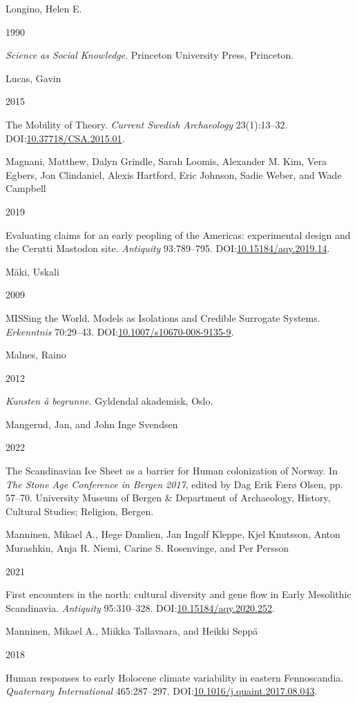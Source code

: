 \documentclass[
  a4paper,
  oneside]{uiophdthesis}
\newlength{\cslhangindent}
\newlength{\csllabelwidth}
\newlength{\cslentryspacingunit} %
\newenvironment{CSLReferences}[2] %
 {%
  \setlength{\parindent}{0pt}
  \ifodd #1
  \let\oldpar\par
  \def\par{\hangindent=\cslhangindent\oldpar}
  \fi
  \setlength{\parskip}{#2\cslentryspacingunit}
 }%
 {}
\newcommand{\CSLBlock}[1]{#1\hfill\break}
\newcommand{\CSLLeftMargin}[1]{\parbox[t]{\csllabelwidth}{#1}}
\newcommand{\CSLRightInline}[1]{\parbox[t]{\linewidth - \csllabelwidth}{#1}\break}
\begin{document}
\begin{CSLReferences}{0}{0}
\leavevmode{}%
\CSLBlock{Longino, Helen E.}
\CSLLeftMargin{ 1990}
\CSLRightInline{\emph{{Science as Social Knowledge}}. Princeton University Press, Princeton.}

\leavevmode{}%
\CSLBlock{Lucas, Gavin}
\CSLLeftMargin{ 2015}
\CSLRightInline{{The Mobility of Theory}. \emph{Current Swedish Archaeology} 23(1):13--32. DOI:\href{https://doi.org/10.37718/CSA.2015.01}{10.37718/CSA.2015.01}.}

\leavevmode{}%
\CSLBlock{Magnani, Matthew, Dalyn Grindle, Sarah Loomis, Alexander M. Kim, Vera Egbers, Jon Clindaniel, Alexis Hartford, Eric Johnson, Sadie Weber, and Wade Campbell}
\CSLLeftMargin{ 2019}
\CSLRightInline{Evaluating claims for an early peopling of the Americas: experimental design and the Cerutti Mastodon site. \emph{Antiquity} 93:789--795. DOI:\href{https://doi.org/10.15184/aqy.2019.14}{10.15184/aqy.2019.14}.}

\leavevmode{}%
\CSLBlock{Mäki, Uskali}
\CSLLeftMargin{ 2009}
\CSLRightInline{{MISSing the World. Models as Isolations and Credible Surrogate Systems}. \emph{Erkenntnis} 70:29--43. DOI:\href{https://doi.org/10.1007/s10670-008-9135-9}{10.1007/s10670-008-9135-9}.}

\leavevmode{}%
\CSLBlock{Malnes, Raino}
\CSLLeftMargin{ 2012}
\CSLRightInline{\emph{{Kunsten å begrunne}}. Gyldendal akademisk, Oslo.}

\leavevmode{}%
\CSLBlock{Mangerud, Jan, and John Inge Svendsen}
\CSLLeftMargin{ 2022}
\CSLRightInline{{The Scandinavian Ice Sheet as a barrier for Human colonization of Norway}. In \emph{{The Stone Age Conference in Bergen 2017}}, edited by Dag Erik Færø Olsen, pp. 57--70. University Museum of Bergen \& Department of Archaeology, History, Cultural Studies; Religion, Bergen.}

\leavevmode{}%
\CSLBlock{Manninen, Mikael A., Hege Damlien, Jan Ingolf Kleppe, Kjel Knutsson, Anton Murashkin, Anja R. Niemi, Carine S. Rosenvinge, and Per Persson}
\CSLLeftMargin{ 2021}
\CSLRightInline{{First encounters in the north: cultural diversity and gene flow in Early Mesolithic Scandinavia}. \emph{Antiquity} 95:310--328. DOI:\href{https://doi.org/10.15184/aqy.2020.252}{10.15184/aqy.2020.252}.}

\leavevmode{}%
\CSLBlock{Manninen, Mikael A., Miikka Tallavaara, and Heikki Seppä}
\CSLLeftMargin{ 2018}
\CSLRightInline{{Human responses to early Holocene climate variability in eastern Fennoscandia}. \emph{Quaternary International} 465:287--297. DOI:\href{https://doi.org/10.1016/j.quaint.2017.08.043}{10.1016/j.quaint.2017.08.043}.}


\end{CSLReferences}
\end{document}
